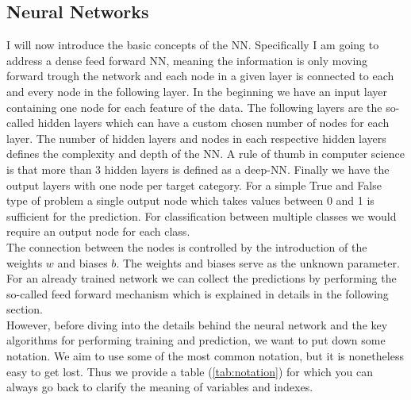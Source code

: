 \subsection{Neural Networks}\label{sec:Neural Networks in physics}
I will now introduce the basic concepts of the \ac{NN}. Specifically
I am going to address a dense feed forward \ac{NN}, meaning the 
information is only moving forward trough the network and each node in a 
given layer is connected to each and every node in the following layer. 
In the beginning we have an input layer containing one node for each feature of 
the data. The following layers are the so-called hidden layers which can have 
a custom chosen number of nodes for each layer. The number of hidden layers and nodes 
in each respective hidden layers defines the complexity and depth of the 
\ac{NN}. A rule of thumb in computer science is that more than 3 hidden 
layers is defined as a deep-\ac{NN}. Finally we have the output 
layers with one node per target category. For a simple True and False type of 
problem a single output node which takes values between 0 and 1 is sufficient 
for the prediction. For classification between multiple classes we would require 
an output node for each class. 
\\
The connection between the nodes is controlled by the introduction of the weights 
$w$ and biases $b$. The weights and biases serve as the unknown parameter. For an 
already trained network we can collect the predictions by performing the so-called 
feed forward mechanism which is explained in details in the following section. 
\\
However, before diving into the details behind the neural network and the key 
algorithms for performing training and prediction, we want to put down some notation. 
We aim to use some of the most common notation, but it is nonetheless easy to get lost. 
Thus we provide a table (\ref{tab:notation}) for which you can always go back to clarify 
the meaning of variables and indexes.

